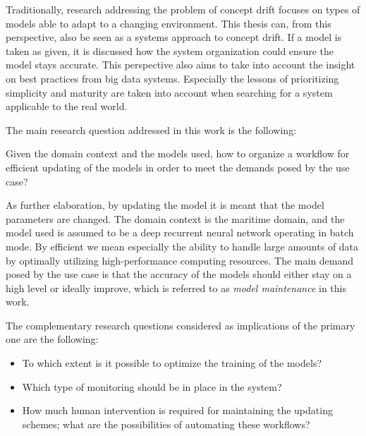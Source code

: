 Traditionally, research addressing the problem of concept drift focuses on types of models able to adapt to a changing environment. This thesis can, from this perspective, also be seen as a systems approach to concept drift. If a model is taken as given, it is discussed how the system organization could ensure the model stays accurate. This perspective also aims to take into account the insight on best practices from big data systems. Especially the lessons of prioritizing simplicity and maturity are taken into account when searching for a system applicable to the real world. 




The main research question addressed in this work is the following:

\begin{center}
    Given the domain context and the models used, how to organize a workflow for efficient updating of the models in order to meet the demands posed by the use case?
\end{center}

 As further elaboration, by updating the model it is meant that the model parameters are changed. The domain context is the maritime domain, and the model used is assumed to be a deep recurrent neural network operating in batch mode. By efficient we mean especially the ability to handle large amounts of data by optimally utilizing high-performance computing resources. The main demand posed by the use case is that the accuracy of the models should either stay on a high level or ideally improve, which is referred to as \textit{model maintenance} in this work.

The complementary research questions considered as implications of the primary one are the following:

\begin{itemize}
    \item To which extent is it possible to optimize the training of the models?
    \item Which type of monitoring should be in place in the system?
    \item How much human intervention is required for maintaining the updating schemes; what are the possibilities of automating these workflows?
\end{itemize}

